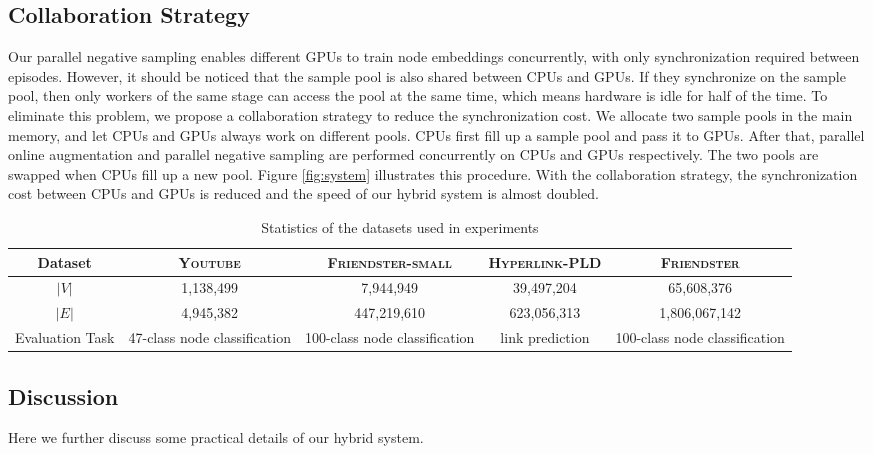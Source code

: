 \documentclass[sigconf]{acmart}
\newcommand{\dataset}[1]{\textsc{#1}\xspace}
\begin{document}
\subsection{Collaboration Strategy}
\label{ref:collaboration_strategy}

Our parallel negative sampling enables different GPUs to train node embeddings concurrently, with only synchronization required between episodes. However, it should be noticed that the sample pool is also shared between CPUs and GPUs. If they synchronize on the sample pool, then only workers of the same stage can access the pool at the same time, which means hardware is idle for half of the time. To eliminate this problem, we propose a collaboration strategy to reduce the synchronization cost. We allocate two sample pools in the main memory, and let CPUs and GPUs always work on different pools. CPUs first fill up a sample pool and pass it to GPUs. After that, parallel online augmentation and parallel negative sampling are performed concurrently on CPUs and GPUs respectively. The two pools are swapped when CPUs fill up a new pool. Figure \ref{fig:system} illustrates this procedure. With the collaboration strategy, the synchronization cost between CPUs and GPUs is reduced and the speed of our hybrid system is almost doubled.

\begin{table*}
    \centering
    \begin{tabular}{ccccc}
        \toprule
        Dataset         & \dataset{Youtube}             & \dataset{Friendster-small}    & \dataset{Hyperlink-PLD}   & \dataset{Friendster}          \\
        \midrule
        $|V|$           & 1,138,499                     & 7,944,949                     & 39,497,204                & 65,608,376                    \\
        $|E|$           & 4,945,382                     & 447,219,610                   & 623,056,313               & 1,806,067,142                 \\
        Evaluation Task & 47-class node classification  & 100-class node classification & link prediction           & 100-class node classification \\
        \bottomrule
    \end{tabular}
    \caption{Statistics of the datasets used in experiments}
    \label{tab:datasets}
\end{table*}

\subsection{Discussion}
Here we further discuss some practical details of our hybrid system.
\end{document}
